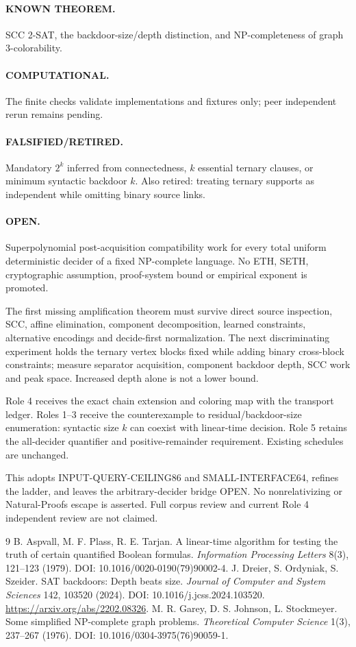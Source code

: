 \documentclass[11pt]{article}
\begin{document}
\paragraph{KNOWN THEOREM.} SCC 2-SAT, the backdoor-size/depth distinction, and NP-completeness of graph 3-colorability.
\paragraph{COMPUTATIONAL.} The finite checks validate implementations and fixtures only; peer independent rerun remains pending.
\paragraph{FALSIFIED/RETIRED.} Mandatory $2^k$ inferred from connectedness, $k$ essential ternary clauses, or minimum syntactic backdoor $k$. Also retired: treating ternary supports as independent while omitting binary source links.
\paragraph{OPEN.} Superpolynomial post-acquisition compatibility work for every total uniform deterministic decider of a fixed NP-complete language. No ETH, SETH, cryptographic assumption, proof-system bound or empirical exponent is promoted.

The first missing amplification theorem must survive direct source inspection, SCC, affine elimination, component decomposition, learned constraints, alternative encodings and decide-first normalization. The next discriminating experiment holds the ternary vertex blocks fixed while adding binary cross-block constraints; measure separator acquisition, component backdoor depth, SCC work and peak space. Increased depth alone is not a lower bound.

Role 4 receives the exact chain extension and coloring map with the transport ledger. Roles 1--3 receive the counterexample to residual/backdoor-size enumeration: syntactic size $k$ can coexist with linear-time decision. Role 5 retains the all-decider quantifier and positive-remainder requirement. Existing schedules are unchanged.

This adopts INPUT-QUERY-CEILING86 and SMALL-INTERFACE64, refines the ladder, and leaves the arbitrary-decider bridge OPEN. No nonrelativizing or Natural-Proofs escape is asserted. Full corpus review and current Role 4 independent review are not claimed.

\begin{thebibliography}{9}
 B. Aspvall, M. F. Plass, R. E. Tarjan. A linear-time algorithm for testing the truth of certain quantified Boolean formulas. \emph{Information Processing Letters} 8(3), 121--123 (1979). DOI: 10.1016/0020-0190(79)90002-4.
 J. Dreier, S. Ordyniak, S. Szeider. SAT backdoors: Depth beats size. \emph{Journal of Computer and System Sciences} 142, 103520 (2024). DOI: 10.1016/j.jcss.2024.103520. \url{https://arxiv.org/abs/2202.08326}.
 M. R. Garey, D. S. Johnson, L. Stockmeyer. Some simplified NP-complete graph problems. \emph{Theoretical Computer Science} 1(3), 237--267 (1976). DOI: 10.1016/0304-3975(76)90059-1.
\end{thebibliography}
\end{document}
